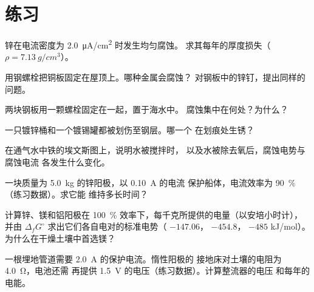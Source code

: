 \section{练习}

\begin{exercise}[$\star$]\label{exo:b2:corrosion:1}
锌在电流密度为 \qty{2.0}{\micro A/cm^2} 时发生均匀腐蚀。
求其每年的厚度损失（$\rho = \qty{7.13}{g/cm^3}$）。
\end{exercise}

\begin{exercise}[$\star$]\label{exo:b2:corrosion:2}
用钢螺栓把铜板固定在屋顶上。哪种金属会腐蚀？
对钢板中的锌钉，提出同样的问题。
\end{exercise}

\begin{exercise}[$\star$]\label{exo:b2:corrosion:3}
两块钢板用一颗螺栓固定在一起，置于海水中。
腐蚀集中在何处？为什么？
\end{exercise}

\begin{exercise}[$\star$]\label{exo:b2:corrosion:4}
一只镀锌桶和一个镀锡罐都被划伤至钢层。哪一个
在划痕处生锈？
\end{exercise}

\begin{exercise}[$\star\star$]\label{exo:b2:corrosion:5}
在通气水中铁的埃文斯图上，说明水被搅拌时，
以及水被除去氧后，腐蚀电势与腐蚀电流
各发生什么变化。
\end{exercise}

\begin{exercise}[$\star\star$]\label{exo:b2:corrosion:6}
一块质量为 \qty{5.0}{kg} 的锌阳极，以 \qty{0.10}{A} 的电流
保护船体，电流效率为 90~\%（练习数据）。求它能
维持多长时间？
\end{exercise}

\begin{exercise}[$\star\star$]\label{exo:b2:corrosion:7}
计算锌、镁和铝阳极在 100~\% 效率下，每千克所提供的电量（以安培小时计），
并由 $\Delta_f G^\circ$ 求出它们各自电对的标准电势（
 $-147.06$， $-454.8$，
 $-485$ \unit{kJ/mol}）。为什么在干燥土壤中首选镁？
\end{exercise}

\begin{exercise}[$\star\star$]\label{exo:b2:corrosion:8}
一根埋地管道需要 \qty{2.0}{A} 的保护电流。惰性阳极的
接地床对土壤的电阻为 \qty{4.0}{\ohm}，电池还需
再提供 \qty{1.5}{V} 的电压（练习数据）。计算整流器的电压
和每年的电能。
\end{exercise}

